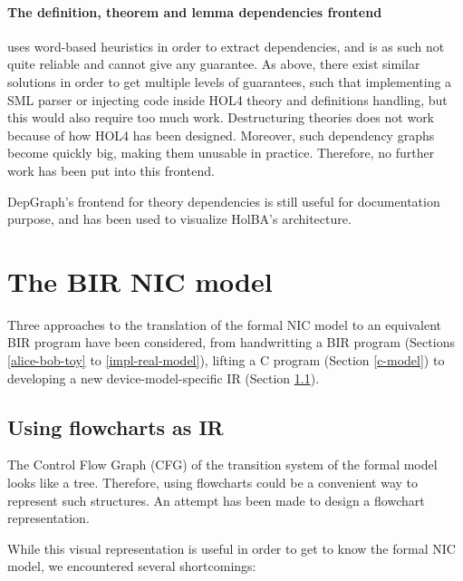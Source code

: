 \documentclass[10pt,a4paper]{article}
\begin{document}
\begin{multicols}{2}
\paragraph{The definition, theorem and lemma dependencies frontend} uses word-based heuristics in order to extract dependencies, and is as such not quite reliable and cannot give any guarantee. As above, there exist similar solutions in order to get multiple levels of guarantees, such that implementing a SML parser or injecting code inside HOL4 theory and definitions handling, but this would also require too much work. Destructuring theories does not work because of how HOL4 has been designed. Moreover, such dependency graphs become quickly big, making them unusable in practice. Therefore, no further work has been put into this frontend.

DepGraph's frontend for theory dependencies is still useful for documentation purpose, and has been used to visualize HolBA's architecture.


\section{The BIR NIC model} \label{nic-model}

Three approaches to the translation of the formal NIC model to an equivalent BIR program have been considered, from handwritting a BIR program (Sections \ref{alice-bob-toy} to \ref{impl-real-model}), lifting a C program (Section \ref{c-model}) to developing a new device-model-specific IR (Section \ref{flowchart-attempt}).

\subsection{Using flowcharts as IR} \label{flowchart-attempt}

The Control Flow Graph ({CFG}) of the transition system of the formal model looks like a tree. Therefore, using flowcharts could be a convenient way to represent such structures. An attempt has been made to design a flowchart representation.

While this visual representation is useful in order to get to know the formal NIC model, we encountered several shortcomings:


\end{multicols}
\end{document}
